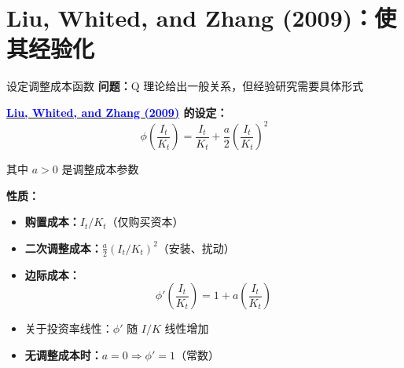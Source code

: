 \documentclass{beamer}
\begin{document}
\section{Liu, Whited, and Zhang (2009)：使其经验化}

\begin{frame}{设定调整成本函数}
    \textbf{问题：}Q 理论给出一般关系，但经验研究需要具体形式

    \vspace{0.2cm}
    \textbf{\href{https://doi.org/10.1086/649760}{\textcolor{blue}{Liu, Whited, and Zhang (2009)}} 的设定：}
    \begin{equation}\label{equ:lwz cost}
        \phi\left(\frac{I_t}{K_t}\right) = \frac{I_t}{K_t} + \frac{a}{2}\left(\frac{I_t}{K_t}\right)^2
    \end{equation}

    其中 $a > 0$ 是调整成本参数


    \textbf{性质：}
    \begin{itemize}
        \item \textbf{购置成本：}$I_t/K_t$（仅购买资本）
        \item \textbf{二次调整成本：}$\frac{a}{2}(I_t/K_t)^2$（安装、扰动）
        \item \textbf{边际成本：}
        \begin{equation}\label{equ:marginal cost}
            \phi'\left(\frac{I_t}{K_t}\right) = 1 + a\left(\frac{I_t}{K_t}\right)
        \end{equation}
        \item 关于投资率线性：$\phi'$ 随 $I/K$ 线性增加
        \item \textbf{无调整成本时：}$a = 0 \Rightarrow \phi' = 1$（常数）
    \end{itemize}
\end{frame}
\end{document}
